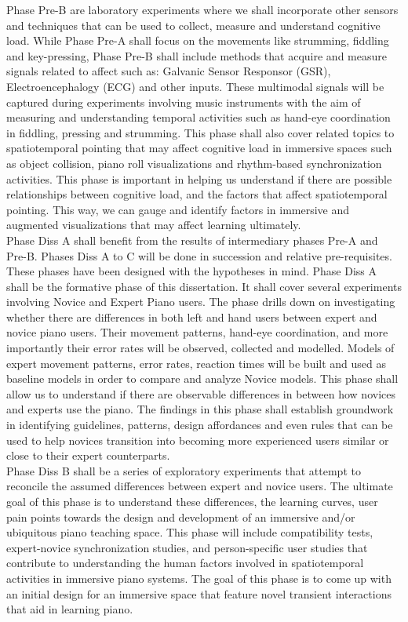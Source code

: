 \documentclass{article}
\begin{document}
Phase Pre-B are laboratory experiments where we shall incorporate other sensors and techniques that can be used to collect, measure and understand cognitive load. While Phase Pre-A shall focus on the movements like strumming, fiddling and key-pressing, Phase Pre-B shall include methods that acquire and measure signals related to affect such as: Galvanic Sensor Responsor (GSR), Electroencephalogy (ECG) and other inputs. These multimodal signals will be captured during experiments involving music instruments with the aim of measuring and understanding temporal activities such as hand-eye coordination in fiddling, pressing and strumming. This phase shall also cover related topics to spatiotemporal pointing that may affect cognitive load in immersive spaces such as object collision, piano roll visualizations and rhythm-based synchronization activities. This phase is important in helping us understand if there are possible relationships between cognitive load, and the factors that affect spatiotemporal pointing. This way, we can gauge and identify factors in immersive and augmented visualizations that may affect learning ultimately. \\

Phase Diss A shall benefit from the results of intermediary phases Pre-A and Pre-B. Phases Diss A to C will be done in succession and relative pre-requisites. These phases have been designed with the hypotheses in mind. Phase Diss A shall be the formative phase of this dissertation. It shall cover several experiments involving Novice and Expert Piano users. The phase drills down on investigating whether there are differences in both left and hand users between expert and novice piano users. Their movement patterns, hand-eye coordination, and more importantly their error rates will be observed, collected and modelled. Models of expert movement patterns, error rates, reaction times will be built and used as baseline models in order to compare and analyze Novice models. This phase shall allow us to understand if there are observable differences in between how novices and experts use the piano. The findings in this phase shall establish groundwork in identifying guidelines, patterns, design affordances and even rules that can be used to help novices transition into becoming more experienced users similar or close to their expert counterparts. \\

Phase Diss B shall be a series of exploratory experiments that attempt to reconcile the assumed differences between expert and novice users. The ultimate goal of this phase is to understand these differences, the learning curves, user pain points towards the design and development of an immersive and/or ubiquitous piano teaching space. This phase will include compatibility tests, expert-novice synchronization studies, and person-specific user studies that contribute to understanding the human factors involved in spatiotemporal activities in immersive piano systems. The goal of this phase is to come up with an initial design for an immersive space that feature novel transient interactions that aid in learning piano. \\
\end{document}
